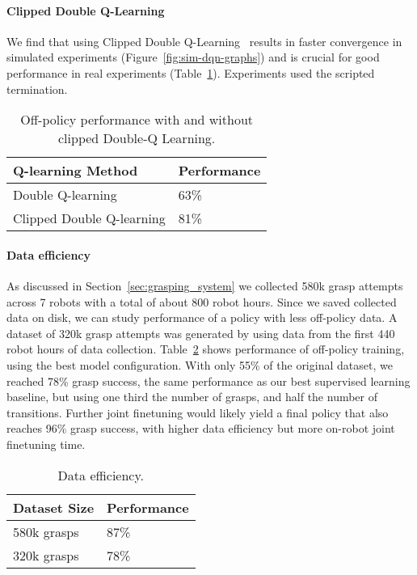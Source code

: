 \documentclass{article}
\begin{document}
\paragraph{Clipped Double Q-Learning}
We find that using Clipped Double Q-Learning~\cite{td3} results in faster convergence in simulated experiments (Figure~\ref{fig:sim-dqn-graphs}) and is crucial for good performance in real experiments (Table~\ref{table:real-qlearn-ablation}). Experiments used the scripted termination. 
\begin{table}[h]
\begin{center}
\begin{tabular}{|p{13em}|p{5em}|}
\hline
Q-learning Method & Performance  \\
\hline
Double Q-learning & 63\% \\ %
\hline
Clipped Double Q-learning & 81\% \\ 
\hline
\end{tabular}
\end{center}
\caption{Off-policy performance with and without clipped Double-Q Learning.}
\label{table:real-qlearn-ablation}
\vspace{-0.25in}
\end{table}\paragraph{Data efficiency}
As discussed in Section~\ref{sec:grasping_system} we collected 580k grasp attempts across 7 robots with a total of about 800 robot hours. Since we saved collected data on disk, we can study performance of a policy with less off-policy data. A dataset of 320k grasp attempts was generated by using data from the first 440 robot hours of data collection.
Table~\ref{tbl:real-data-efficiency} shows performance of off-policy training, using the best model configuration. With only 55\% of the original dataset, we reached 78\% grasp success, the same performance as our best supervised learning baseline, but using one third the number of grasps, and half the number of transitions. Further joint finetuning would likely yield a final policy that also reaches 96\% grasp success, with higher data efficiency but more on-robot joint finetuning time.
\begin{table}[h]
\begin{center}
\begin{tabular}{|p{7em}|p{5em}|}
\hline
Dataset Size & Performance  \\
\hline
580k grasps & 87\% \\ 
\hline
320k grasps & 78\% \\ 
\hline
\end{tabular}
\end{center}
\caption{Data efficiency.}
\label{tbl:real-data-efficiency}
\vspace{-0.25in}
\end{table}
\end{document}
